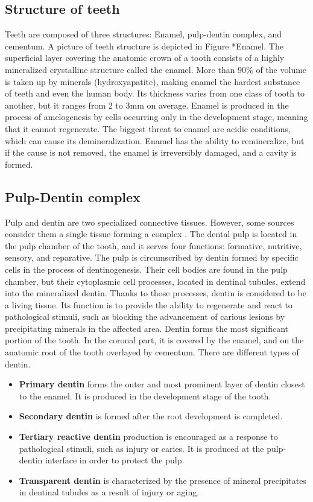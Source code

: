 \subsection{Structure of teeth}
Teeth are composed of three structures: Enamel, pulp-dentin complex, and cementum. A picture of teeth structure is depicted in Figure *{Enamel}.
The superficial layer covering the anatomic crown of a tooth consists of a highly mineralized crystalline structure called the enamel. More than 90\% of the volume is taken up by minerals (hydroxyapatite), making enamel the hardest substance of teeth and even the human body. Its thickness varies from one class of tooth to another, but it ranges from 2 to 3mm on average. Enamel is produced in the process of amelogenesis by cells occurring only in the development stage, meaning that it cannot regenerate. The biggest threat to enamel are acidic conditions, which can cause its demineralization. Enamel has the ability to remineralize, but if the cause is not removed, the enamel is irreversibly damaged, and a cavity is formed.

\subsection*{Pulp-Dentin complex}
Pulp and dentin are two specialized connective tissues. However, some sources consider them a single tissue forming a complex \cite{2019a}.
The dental pulp is located in the pulp chamber of the tooth, and it serves four functions: formative, nutritive, sensory, and reparative.
The pulp is circumscribed by dentin formed by specific cells in the process of dentinogenesis. Their cell bodies are found in the pulp chamber, but their cytoplasmic cell processes, located in dentinal tubules, extend into the mineralized dentin. Thanks to those processes, dentin is considered to be a living tissue. Its function is to provide the ability to regenerate and react to pathological stimuli, such as blocking the advancement of carious lesions by precipitating minerals in the affected area.
Dentin forms the most significant portion of the tooth. In the coronal part, it is covered by the enamel, and on the anatomic root of the tooth overlayed by cementum. There are different types of dentin.
\begin{itemize}
    \item \textbf{Primary dentin} forms the outer and most prominent layer of dentin closest to the enamel. It is produced in the development stage of the tooth.
    \item \textbf {Secondary dentin} is formed after the root development is completed.
    \item \textbf{Tertiary reactive dentin} production is encouraged as a response to pathological stimuli, such as injury or caries. It is produced at the pulp-dentin interface in order to protect the pulp.
    \item \textbf{Transparent dentin} is characterized by the presence of mineral precipitates in dentinal tubules as a result of injury or aging.
\end{itemize}


